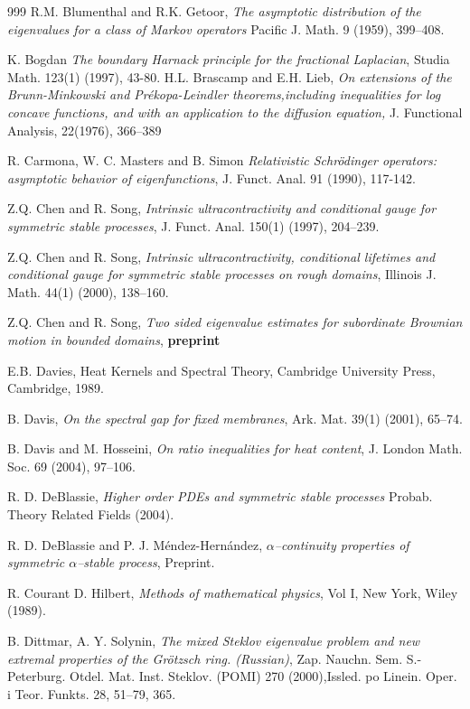 \documentclass[11pt,leqno]{article}
\theoremstyle{definition}
\numberwithin{equation}{section}
\begin{document}
\begin{thebibliography}{999}
R{.}M{.} Blumenthal and R{.}K{.}
Getoor,
\emph{The asymptotic distribution of the eigenvalues for a
class of Markov
operators}
Pacific J. Math. 9 (1959),
399--408.

K. Bogdan \emph{The boundary Harnack principle for the fractional Laplacian}, Studia Math. 123(1) (1997), 43-80.
H{.}L{.} Brascamp  and E{.}H{.} Lieb,
\emph{On extensions of
the Brunn-Minkowski and Pr\'{e}kopa-Leindler theorems,including inequalities
for log concave functions, and with an application to the diffusion
equation,} J. Functional Analysis, 22(1976), 366--389

R. Carmona, W. C. Masters and B. Simon
\emph{Relativistic Schr\"odinger operators: asymptotic behavior of eigenfunctions},
J. Funct. Anal. 91 (1990), 117-142.

Z{.}Q{.} Chen and R{.}
Song,
\emph{Intrinsic ultracontractivity and conditional gauge for
symmetric  stable processes},
J{.} Funct{.} Anal{.} 150(1) (1997),
204--239.


Z{.}Q{.} Chen and R{.}
Song,
\emph{Intrinsic ultracontractivity, conditional lifetimes and
   conditional gauge for symmetric stable processes on rough  domains},
Illinois J{.} Math{.} 44(1) (2000),
138--160.

Z{.}Q{.} Chen and R{.}
Song,
\emph{Two sided eigenvalue estimates for subordinate Brownian motion in bounded domains},
{\bf preprint}

 E{.}B{.} Davies, Heat Kernels and
Spectral Theory, Cambridge
University Press,
Cambridge,
1989.

 B{.} Davis,
\emph{On the
spectral gap for fixed membranes},
Ark{.} Mat{.} 39(1) (2001),
65--74.

 B{.} Davis and M{.} Hosseini, \emph{On ratio inequalities for heat content},
J. London Math. Soc.  69 (2004),  97--106.


 R. D. DeBlassie,
\emph{Higher order PDEs and symmetric stable processes}
Probab. Theory Related Fields (2004).

 R. D. DeBlassie and P{.} J{.} M\'endez-Hern\'andez,
\emph{$\alpha$--continuity properties of symmetric $\alpha$--stable process},  Preprint. 

R. Courant D. Hilbert, \emph{Methods of mathematical physics}, Vol I, New York, Wiley
(1989).

B{.} Dittmar, A{.} Y{.} Solynin,
\emph{The
mixed Steklov eigenvalue problem and new extremal properties of
the Gr{\"o}tzsch ring. (Russian)},
Zap. Nauchn. Sem. S.-Peterburg.
Otdel. Mat. Inst. Steklov. (POMI) 270
(2000),Issled. po Linein. Oper.
i Teor. Funkts. 28, 51--79, 365.





\end{thebibliography}
\end{document}
